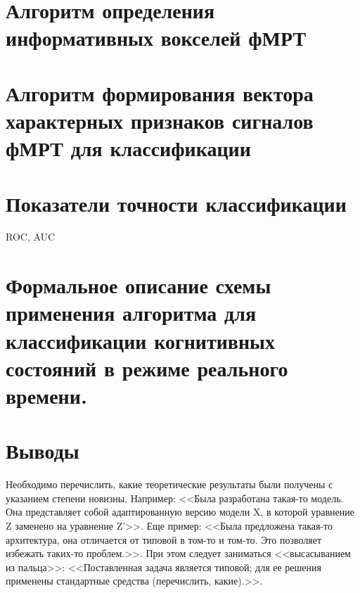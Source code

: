 \section{Алгоритм определения информативных вокселей фМРТ}


\section{Алгоритм формирования вектора характерных признаков сигналов фМРТ для классификации}

\section{Показатели точности классификации}

ROC, AUC

\section{Формальное описание схемы применения алгоритма для классификации когнитивных состояний в режиме реального времени.}

\section{Выводы}

Необходимо перечислить, какие теоретические результаты были получены с указанием степени новизны. Например: <<Была разработана такая-то модель. Она представляет собой адаптированную версию модели X, в которой уравнение Z заменено на уравнение Z'>>. Еще пример: <<Была предложена такая-то архитектура, она отличается от типовой в том-то и том-то. Это позволяет избежать таких-то проблем.>>. При этом следует заниматься <<высасыванием из пальца>>: <<Поставленная задача является типовой; для ее решения применены стандартные средства (перечислить, какие).>>.